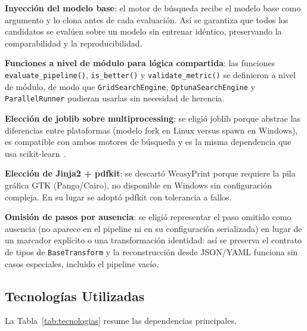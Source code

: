 \documentclass[conference,spanish]{IEEEtran}
\begin{document}
\textbf{Inyección del modelo base}: el motor de búsqueda recibe el modelo
base como argumento y lo clona antes de cada
evaluación. Así se garantiza que todos los candidatos se evalúen sobre un
modelo sin entrenar idéntico, preservando la comparabilidad y la
reproducibilidad.

\textbf{Funciones a nivel de módulo para lógica compartida}: las funciones
\texttt{evaluate\_pipeline()}, \texttt{is\_better()} y
\texttt{validate\_metric()} se definieron a nivel de módulo, de modo que
\texttt{GridSearchEngine}, \texttt{OptunaSearchEngine} y
\texttt{ParallelRunner} pudieran usarlas sin necesidad de herencia.

\textbf{Elección de joblib sobre multiprocessing}: se eligió joblib porque abstrae las diferencias entre plataformas
(modelo fork en Linux versus spawn en Windows), es
compatible con ambos motores de búsqueda y es la misma dependencia que usa
scikit-learn~\cite{pedregosa2011sklearn}.

\textbf{Elección de Jinja2 + pdfkit}: se descartó WeasyPrint porque
requiere la pila gráfica GTK (Pango/Cairo), no disponible en Windows sin
configuración compleja. En su lugar se adoptó pdfkit con
tolerancia a fallos.

\textbf{Omisión de pasos por ausencia}: se eligió representar el paso
omitido como ausencia (no aparece en el pipeline ni en su configuración
serializada) en lugar de un marcador explícito o una transformación
identidad: así se preserva el contrato de tipos de \texttt{BaseTransform}
y la reconstrucción desde JSON/YAML funciona sin casos especiales,
incluido el pipeline vacío.

\subsection{Tecnologías Utilizadas}

La Tabla~\ref{tab:tecnologias} resume las dependencias principales.
\end{document}
